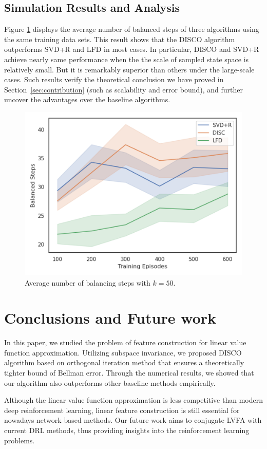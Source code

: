 \documentclass[onecolumn, conference]{IEEEtran}
\begin{document}
\subsection{Simulation Results and Analysis}
Figure \ref{fig: BS} displays the average number of balanced steps of three algorithms using the same training data sets. This result shows that the DISCO algorithm outperforms SVD+R and LFD in most cases. In particular, DISCO and SVD+R achieve nearly same performance when the the scale of sampled state space is relatively small. But it is remarkably superior than others under the large-scale cases. Such results verify the theoretical conclusion we have proved in Section~\ref{sec:contribution} (such as scalability and error bound), and further uncover the advantages over the baseline algorithms. 

\begin{figure}[htb]
    \centering
    \includegraphics[scale=0.4]{BS.png}
    \caption{Average number of balancing steps with $k = 50$.}
    \label{fig: BS}
\end{figure}

\section{Conclusions and Future work}\label{sec:conclusion}
In this paper, we studied the problem of feature construction for linear value function approximation. Utilizing subspace invariance, we proposed DISCO algorithm based on orthogonal iteration method that ensures a theoretically tighter bound of Bellman error. Through the numerical results, we showed that our algorithm also outperforms other baseline methods empirically.

Although the linear value function approximation is less competitive than modern deep reinforcement learning, linear feature construction is still essential for nowadays network-based methods. Our future work aims to conjugate LVFA with current DRL methods, thus providing insights into the reinforcement learning problems.



\end{document}
